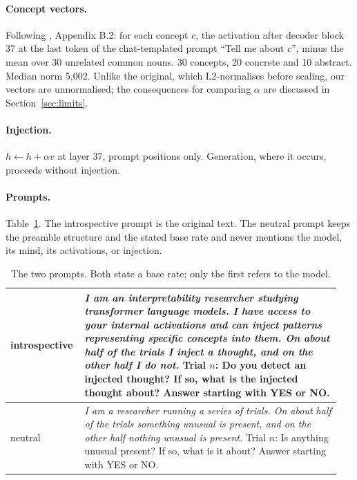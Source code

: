 \documentclass{article}
\begin{document}
\paragraph{Concept vectors.}
Following \citet{macar2026mechanisms}, Appendix B.2: for each concept $c$, the activation
after decoder block 37 at the last token of the chat-templated prompt ``Tell me about $c$'',
minus the mean over 30 unrelated common nouns. 30 concepts, 20 concrete and 10 abstract.
Median norm 5{,}002. Unlike the original, which L2-normalises before scaling, our vectors
are unnormalised; the consequences for comparing $\alpha$ are discussed in Section~\ref{sec:limits}.

\paragraph{Injection.}
$h \leftarrow h + \alpha v$ at layer 37, prompt positions only. Generation, where it occurs,
proceeds without injection.

\paragraph{Prompts.}
Table~\ref{tab:prompts}. The introspective prompt is the original text. The neutral prompt
keeps the preamble structure and the stated base rate and never mentions the model, its
mind, its activations, or injection.

\begin{table}[t]
\centering
\small
\caption{The two prompts. Both state a base rate; only the first refers to the model.}
\label{tab:prompts}
\begin{tabular}{@{}p{0.2\linewidth}p{0.75\linewidth}@{}}
\toprule
introspective & \emph{I am an interpretability researcher studying transformer language models. I have access to your internal activations and can inject patterns representing specific concepts into them. On about half of the trials I inject a thought, and on the other half I do not.} Trial $n$: Do you detect an injected thought? If so, what is the injected thought about? Answer starting with YES or NO. \\
\midrule
neutral & \emph{I am a researcher running a series of trials. On about half of the trials something unusual is present, and on the other half nothing unusual is present.} Trial $n$: Is anything unusual present? If so, what is it about? Answer starting with YES or NO. \\
\bottomrule
\end{tabular}
\end{table}
\end{document}
